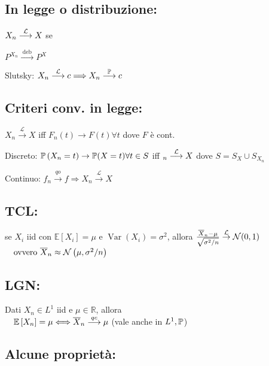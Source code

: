 \subsection{In legge o distribuzione:}

$\text{}$ \\

$X_{n} \stackrel{\mathcal{L}}{\longrightarrow} X$ se

$P^{X_{n}} \stackrel{\text { deb }}{\longrightarrow} P^{X}$

Slutsky: $X_{n} \stackrel{\mathcal{L}}{\longrightarrow} c \Longrightarrow X_{n} \stackrel{\mathbb{P}}{\longrightarrow} c$

\subsection{Criteri conv. in legge:}

$X_{n} \stackrel{\mathcal{L}}{\longrightarrow} X$ iff $F_{n}(t) \rightarrow F(t) \forall t$ dove $F$ è cont.

Discreto: $\mathbb{P}\left(X_{n}=t\right) \rightarrow \mathbb{P}(X=t) \forall t\in S$ iff $_{n} \stackrel{\mathcal{L}}{\longrightarrow} X$ dove $S=S_{X} \cup S_{X_{n}}$

Continuo: $f_{n} \stackrel{q o}{\longrightarrow} f \Longrightarrow X_{n} \stackrel{\mathcal{L}}{\longrightarrow} X$

\subsection{TCL:}

se $X_{i}$ iid con $\mathbb{E}\left[X_{i}\right]=\mu$ e $\operatorname{Var}\left(X_{i}\right)=\sigma^{2}$, allora $\frac{\overline{X}_n-\mu}{\sqrt{\sigma^{2} / n}} \stackrel{\mathcal{L}}{\rightarrow} \mathcal{N}(0,1)$ \\
$\text{}\quad\text{ovvero }\overline{X}_n \approx \mathcal{N}\left(\mu, \sigma^{2} / n\right)$

\subsection{LGN:}

Dati $X_{n} \in L^{1}$ iid e $\mu \in \mathbb{R}$, allora \\
$\text{}\quad\mathbb{E}\left[X_{n}\right]=\mu \Longleftrightarrow \overline{X}_n \stackrel{q c}{\longrightarrow} \mu$ (vale anche in $L^1,\mathbb{P}$)

\subsection{Alcune proprietà:}

